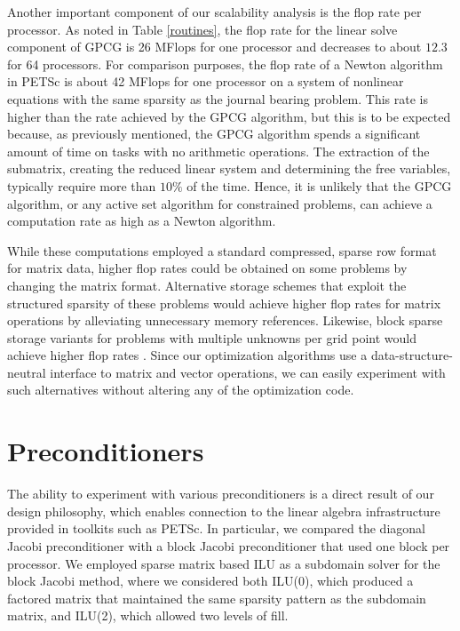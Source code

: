 Another important component of our scalability analysis is
the flop rate per processor.
As noted in Table \ref{routines}, the flop rate for the
linear solve component of GPCG is 26 MFlops for
one processor and decreases to about $ 12.3 $ for 64 processors.
For comparison purposes, the flop rate of a Newton algorithm in
PETSc is about 42 MFlops for one processor on a system of nonlinear
equations with the same sparsity as the journal bearing problem.
This rate is higher than the rate achieved by the GPCG algorithm,
but this is to be expected because,  as previously mentioned, 
the GPCG algorithm spends a significant amount of time on tasks
with no arithmetic operations.  The extraction of the submatrix,
creating the reduced linear system and determining the
free variables, typically require more than $ 10\% $ of the time.
Hence, it is unlikely that the GPCG algorithm, or any 
active set algorithm for constrained problems, can
achieve a computation rate as high as a Newton algorithm.

While these computations employed a standard 
compressed, sparse row format for matrix data,
higher flop rates could be obtained on
some problems by changing the matrix format.
Alternative storage
schemes that exploit the structured sparsity of these problems would
achieve higher flop rates for matrix operations by alleviating
unnecessary memory references.  Likewise, block sparse storage
variants for problems with multiple unknowns per grid point would
achieve higher flop rates \cite{gkmt98}.  Since our optimization
algorithms use a data-structure-neutral interface to matrix and vector
operations, we can easily experiment with such alternatives without
altering any of the optimization code.

\section{Preconditioners}

\label{sec:preconditioners}

The ability to experiment with various preconditioners is
a direct result of our design philosophy, which enables
connection to the 
linear algebra infrastructure provided in toolkits such as PETSc.
In particular, we compared the diagonal Jacobi
preconditioner with a block Jacobi preconditioner that used
one block per processor.
We employed sparse matrix based ILU as a subdomain solver for the block
Jacobi method, where we considered both ILU(0), which produced a
factored matrix that maintained the same sparsity pattern as the
subdomain matrix, and ILU(2), which allowed two levels of fill.

